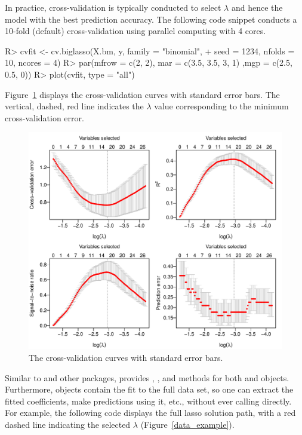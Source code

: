 In practice, cross-validation is typically conducted to select $\lambda$ and hence the model with the best prediction accuracy. The following code snippet conducts a 10-fold (default) cross-validation using parallel computing with 4 cores.
\begin{example}
R> cvfit <- cv.biglasso(X.bm, y, family = "binomial",
+                       seed = 1234, nfolds = 10, ncores = 4)
R> par(mfrow = c(2, 2), mar = c(3.5, 3.5, 3, 1) ,mgp = c(2.5, 0.5, 0))
R> plot(cvfit, type = "all")
\end{example}

Figure~\ref{data_example_cv} displays the cross-validation curves with standard error bars. The vertical, dashed, red line indicates the $\lambda$ value corresponding to the minimum cross-validation error.

\begin{figure}[ht]
\centering
\includegraphics[scale=0.7]{Figures/JSS_data_example_cv.pdf}
\caption{The cross-validation curves with standard error bars.}
\label{data_example_cv}
\end{figure}

Similar to  and other packages,  provides , , and  methods for both  and  objects.  Furthermore,  objects contain the  fit to the full data set, so one can extract the fitted coefficients, make predictions using it, etc., without ever calling  directly.  For example, the following code displays the full lasso solution path, with a red dashed line indicating the selected $\lambda$ (Figure~\ref{data_example}).

